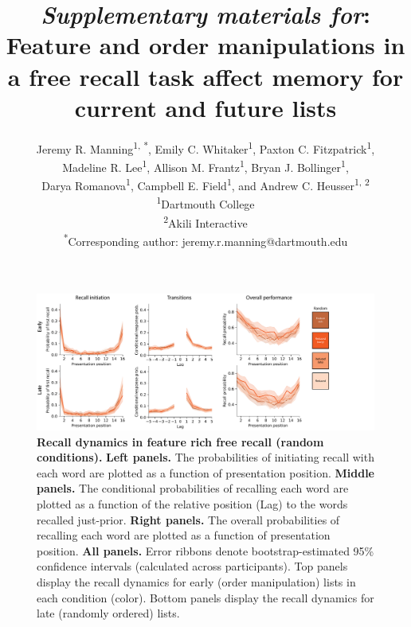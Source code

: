 \documentclass{article}
\title{\textit{Supplementary materials for}: Feature and order manipulations in
a free recall task affect memory for current and future lists}
\author{Jeremy R. Manning\textsuperscript{1, *}, Emily C.
Whitaker\textsuperscript{1}, Paxton C. Fitzpatrick\textsuperscript{1},
\\Madeline R. Lee\textsuperscript{1}, Allison M. Frantz\textsuperscript{1},
Bryan J. Bollinger\textsuperscript{1},\\Darya Romanova\textsuperscript{1},
Campbell E. Field\textsuperscript{1}, and Andrew C. Heusser\textsuperscript{1,
2}\\\textsuperscript{1}Dartmouth College\\\textsuperscript{2}Akili
Interactive\\\textsuperscript{*}Corresponding author:
jeremy.r.manning@dartmouth.edu}
\date{}
\begin{document}
\renewcommand{\figurename}{Supplementary Figure}


\setcounter{equation}{0}
\setcounter{figure}{0}
\setcounter{table}{0}
\setcounter{page}{1}
\setcounter{section}{0}
\makeatletter
\renewcommand{\theequation}{S\arabic{equation}}
\renewcommand{\thefigure}{S\arabic{figure}}
\renewcommand{\bibnumfmt}[1]{[S#1]}
\renewcommand{\citenumfont}[1]{S#1}

\maketitle

\begin{figure}[p] \centering
\includegraphics[width=\textwidth]{figures/recall_dynamics_random}

\caption{\textbf{Recall dynamics in feature rich free recall (random conditions).} \textbf{Left panels.} The probabilities of
initiating recall with each word are plotted as a function of presentation
position. \textbf{Middle panels.} The conditional probabilities of recalling
each word are plotted as a function of the relative position (Lag) to the words
recalled just-prior. \textbf{Right panels.} The overall probabilities of
recalling each word are plotted as a function of presentation position.
\textbf{All panels.} Error ribbons denote bootstrap-estimated 95\% confidence
intervals (calculated across participants). Top panels display the recall
dynamics for early (order manipulation) lists in each condition (color). Bottom
panels display the recall dynamics for late (randomly ordered) lists.}

    \label{fig:recall-dynamics-random}
\end{figure}
\end{document}
